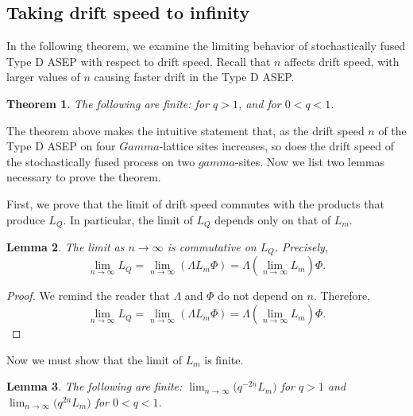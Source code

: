 \documentclass[10pt,a4paper]{amsart}
\numberwithin{equation}{section}
\newtheorem{Theorem}{Theorem}[section]
\newtheorem{Lemma}[Theorem]{Lemma}
\theoremstyle{definition}
\def\Gamma{Gamma}
\def\gamma{gamma}
\begin{document}
\subsection{Taking drift speed to infinity}

In the following theorem, we examine the limiting behavior of stochastically fused Type D ASEP with respect to drift speed. Recall that $n$ affects drift speed, with larger values of $n$ causing faster drift in the Type D ASEP.

\begin{Theorem}\label{finiteLimitTheorem}
The following are finite:  for $q > 1$, and  for $0 < q < 1$.
\end{Theorem}

The theorem above makes the intuitive statement that, as the drift speed $n$ of the Type D ASEP on four $\Gamma$-lattice sites increases, so does the drift speed of the stochastically fused process on two $\gamma$-sites. Now we list two lemmas necessary to prove the theorem.

First, we prove that the limit of drift speed commutes with the products that produce $L_Q$. In particular, the limit of $L_Q$ depends only on that of $L_m$.

\begin{Lemma}
\label{commutativityProposition}
The limit as $n \to \infty$ is commutative on $L_Q$. Precisely, \[\lim_{n \to \infty} L_Q = \lim_{n \to \infty} (\Lambda L_m \Phi) = \Lambda (\lim_{n \to \infty} L_m) \Phi.\]
\end{Lemma}

\begin{proof} \label{commutativity_proof}
We remind the reader that $\Lambda$ and $\Phi$ do not depend on $n$. Therefore,
\[\lim_{n \to \infty} L_Q = \lim_{n \to \infty} (\Lambda L_m \Phi) = \Lambda (\lim_{n \to \infty} L_m) \Phi.\tag*{\qed}
\]\renewcommand{\qed}{}
\end{proof}

Now we must show that the limit of $L_m$ is finite.

\begin{Lemma}
\label{finiteProposition}
The following are finite: $\lim_{n \to \infty} \bigl(q^{-2n} L_m\bigr)$ for $q >1$ and $\lim_{n \to \infty} \bigl(q^{2n} L_m\bigr)$ for $0 < q < 1$.
\end{Lemma}
\end{document}
